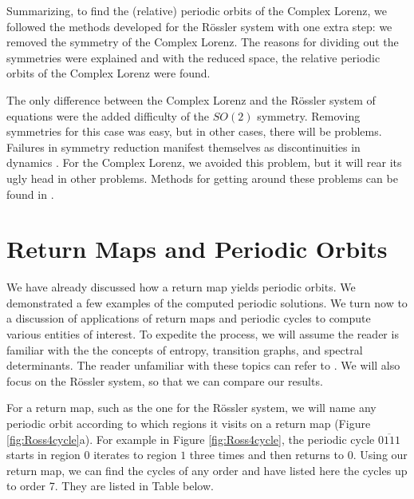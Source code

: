 \documentclass[aip,cha,reprint,
secnumarabic,
nofootinbib, tightenlines,
nobibnotes, showkeys, showpacs,
groupedaddress
]{revtex4-1}
\begin{document}
Summarizing, to find the (relative) periodic orbits of the Complex Lorenz, we followed the methods developed for the R\"ossler system with one extra step: we removed the symmetry of the Complex Lorenz.  The reasons for dividing out the symmetries were explained and with the reduced space, the relative periodic orbits of the Complex Lorenz were found.

The only difference between the Complex Lorenz and the R\"ossler system of equations were the added difficulty of the $SO(2)$ symmetry.  Removing symmetries for this case was easy, but in other cases, there will be problems.  Failures in symmetry reduction manifest themselves as discontinuities in dynamics \cite{Atl}.  For the Complex Lorenz, we avoided this problem, but it will rear its ugly head in other problems.  Methods for getting around these problems can be found in \cite{Atl}.

\section{Return Maps and Periodic Orbits}
\label{sec:Retmaps}
We have already discussed how a return map yields periodic orbits.  We demonstrated a few examples of the computed periodic solutions.  We turn now to a discussion of applications of return maps and periodic cycles to compute various entities of interest.  To expedite the process, we will assume the reader is familiar with the the concepts of entropy, transition graphs, and spectral determinants.  The reader unfamiliar with these topics can refer to \cite{CB}.  We will also focus on the R\"ossler system, so that we can compare our results.

For a return map, such as the one for the R\"ossler system, we will name any periodic orbit according to which regions it visits on a return map (Figure \ref{fig:Ross4cycle}a).  For example in Figure \ref{fig:Ross4cycle}, the periodic cycle $\overline{0111}$ starts in region $0$ iterates to region $1$ three times and then returns to $0$.  Using our return map, we can find the cycles of any order and have listed here the cycles up to order 7.  They are listed in Table below.
\end{document}
